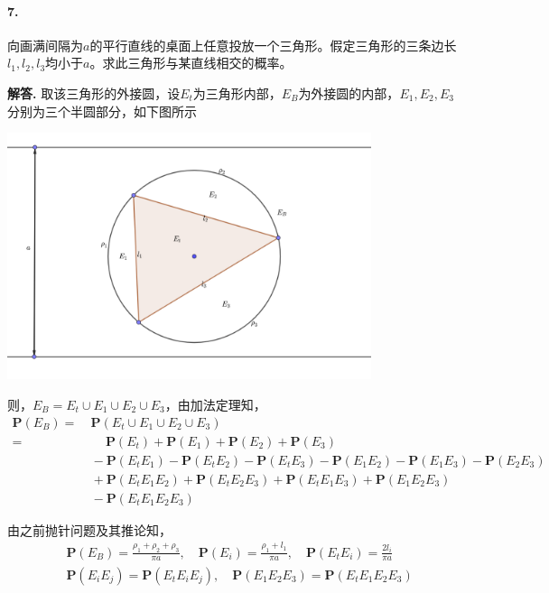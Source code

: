 \documentclass[12pt, a4paper, oneside]{ctexart}
\newenvironment{solution}{\par\noindent\textbf{解答. }}{\bigskip\par}
\begin{document}
\paragraph{7.}向画满间隔为$a$的平行直线的桌面上任意投放一个三角形。假定三角形的三条边长$l_1,l_2,l_3$均小于$a$。求此三角形与某直线相交的概率。
\begin{solution}取该三角形的外接圆，设$E_t$为三角形内部，$E_B$为外接圆的内部，$E_1,E_2,E_3$分别为三个半圆部分，如下图所示

    \centerline{
        \includegraphics[width=0.8\textwidth]{figure.png}
    }

    则，$E_B=E_t\cup E_1\cup E_2\cup E_3$，由加法定理知，
    \begin{equation*}
        \begin{aligned}
            \textbf{P}(E_B) =&\ \textbf{P}(E_t\cup E_1\cup E_2\cup E_3)\\
            =&\quad\ \,\textbf{P}(E_t)+\textbf{P}(E_1)+\textbf{P}(E_2)+\textbf{P}(E_3)\\
            &\ -\textbf{P}(E_tE_1)-\textbf{P}(E_tE_2)-\textbf{P}(E_tE_3)-\textbf{P}(E_1E_2)-\textbf{P}(E_1E_3)-\textbf{P}(E_2E_3)\\
            &\ +\textbf{P}(E_tE_1E_2)+\textbf{P}(E_tE_2E_3)+\textbf{P}(E_tE_1E_3)+\textbf{P}(E_1E_2E_3)\\
            &\ -\textbf{P}(E_tE_1E_2E_3)
        \end{aligned}
    \end{equation*}

    由之前抛针问题及其推论知，
    \begin{equation*}
        \begin{aligned}
            &\textbf{P}(E_B) = \frac{\rho_1+\rho_2+\rho_3}{\pi a},\quad\textbf{P}(E_i) = \frac{\rho_1+l_1}{\pi a},\quad \textbf{P}(E_tE_i) = \frac{2l_i}{\pi a}\\
            &\textbf{P}(E_iE_j)=\textbf{P}(E_tE_iE_j),\quad \textbf{P}(E_1E_2E_3) = \textbf{P}(E_tE_1E_2E_3)
        \end{aligned}
    \end{equation*}


\end{solution}
\end{document}
